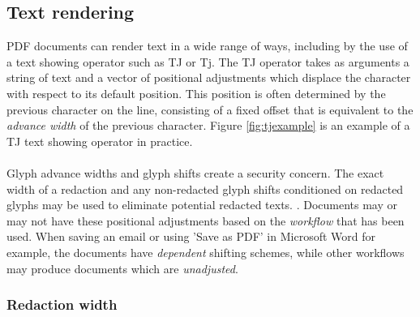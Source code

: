 \subsection{Text rendering}
PDF documents can render text in a wide range of ways, including by the use of a text showing operator such as TJ or Tj. The TJ operator takes as arguments a string of text and a vector of positional adjustments which displace the character with respect to its default position. This position is often determined by the previous character on the line, consisting of a fixed offset that is equivalent to the \textit{advance width} of the previous character. Figure \ref{fig:tjexample} is an example of a TJ text showing operator in practice.
\\\\
Glyph advance widths and glyph shifts create a security concern. The exact width of a redaction and any non-redacted glyph shifts conditioned on redacted glyphs may be used to eliminate potential redacted texts. \cite{bland2022story}. Documents may or may not have these positional adjustments based on the \textit{workflow} that has been used. When saving an email or using 'Save as PDF' in Microsoft Word for example, the documents have \textit{dependent} shifting schemes, while other workflows may produce documents which are \textit{unadjusted}.

\subsubsection{Redaction width}


